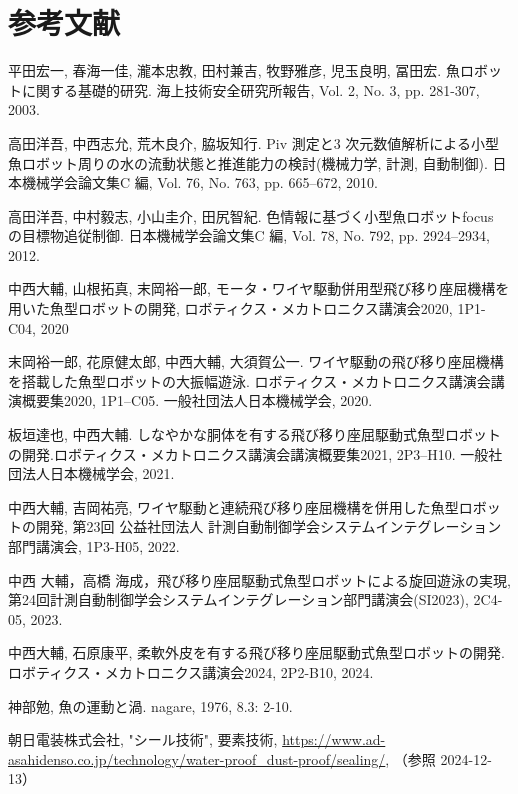 
\newpage
\section{参考文献}
\begin{thebibliography}{9}
    平田宏一, 春海一佳, 瀧本忠教, 田村兼吉, 牧野雅彦, 児玉良明, 冨田宏. 魚ロボットに関する基礎的研究. 海上技術安全研究所報告, Vol. 2, No. 3, pp. 281-307, 2003.
 
    高田洋吾, 中西志允, 荒木良介, 脇坂知行. Piv 測定と3 次元数値解析による小型魚ロボット周りの水の流動状態と推進能力の検討(機械力学, 計測, 自動制御). 日本機械学会論文集C 編, Vol. 76, No. 763, pp. 665–672, 2010.

    高田洋吾, 中村毅志, 小山圭介, 田尻智紀. 色情報に基づく小型魚ロボットfocus の目標物追従制御. 日本機械学会論文集C 編, Vol. 78, No. 792, pp. 2924–2934, 2012.

    中西大輔, 山根拓真, 末岡裕一郎, モータ・ワイヤ駆動併用型飛び移り座屈機構を用いた魚型ロボットの開発, ロボティクス・メカトロニクス講演会2020, 1P1-C04, 2020

    末岡裕一郎, 花原健太郎, 中西大輔, 大須賀公一. ワイヤ駆動の飛び移り座屈機構を搭載した魚型ロボットの大振幅遊泳. ロボティクス・メカトロニクス講演会講演概要集2020, 1P1–C05. 一般社団法人日本機械学会, 2020.

    板垣達也, 中西大輔. しなやかな胴体を有する飛び移り座屈駆動式魚型ロボットの開発.ロボティクス・メカトロニクス講演会講演概要集2021, 2P3–H10. 一般社団法人日本機械学会, 2021.

    中西大輔, 吉岡祐亮, ワイヤ駆動と連続飛び移り座屈機構を併用した魚型ロボットの開発, 第23回 公益社団法人 計測自動制御学会システムインテグレーション部門講演会, 1P3-H05, 2022.

    中西 大輔，高橋 海成，飛び移り座屈駆動式魚型ロボットによる旋回遊泳の実現, 第24回計測自動制御学会システムインテグレーション部門講演会(SI2023), 2C4-05, 2023.

    中西大輔, 石原康平, 柔軟外皮を有する飛び移り座屈駆動式魚型ロボットの開発. ロボティクス・メカトロニクス講演会2024, 2P2-B10, 2024.

    神部勉, 魚の運動と渦. nagare, 1976, 8.3: 2-10.

    朝日電装株式会社, "シール技術", 要素技術, \url{https://www.ad-asahidenso.co.jp/technology/water-proof_dust-proof/sealing/}, （参照 2024-12-13）

\end{thebibliography}


